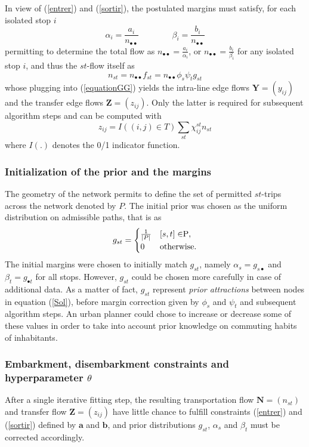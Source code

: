 \documentclass{bmcart}
\begin{document}
In view of (\ref{entrer}) and (\ref{sortir}), the postulated margins must satisfy, for each isolated stop $i$
\begin{equation}
\label{ }
\alpha_i=\frac{a_i}{n_{\bullet \bullet}}\qquad\qquad \beta_i=\frac{b_i}{n_{\bullet \bullet}}
\end{equation}
permitting to determine the total flow as $n_{\bullet \bullet}=\frac{a_i}{\alpha_i}$, or  $n_{\bullet \bullet}=\frac{b_i}{\beta_i}$ for any isolated stop $i$, and thus 
the $st$-flow itself as 
\begin{equation}
	\label{flow_from_distrib}
	n_{st} = n_{\bullet \bullet} f_{st}= n_{\bullet \bullet}\phi_s \psi_t g_{st} 
\end{equation}
whose plugging into (\ref{equationGG}) yields the intra-line edge flows $\mathbf{Y}=(y_{ij})$ and the transfer edge flows $\mathbf{Z}=(z_{ij})$. Only the latter is required for subsequent algorithm steps and can be computed with 
\begin{equation}
	z_{ij} = I((i,j) \in T)\sum_{st} \chi_{ij}^{st} n_{st}
\end{equation}
where $I(.)$ denotes the 0/1 indicator function.
\subsubsection{Initialization of the prior and the margins}
The geometry of the network permits to define the set of permitted $st$-trips across the network denoted by $P$. The initial prior was chosen as the uniform distribution on admissible paths, that is as
\begin{equation*}
g_{st} = \begin{cases}
  \frac{1}{\vert P \vert}    & [s, t] \in $P$, \\
  0    & \text{otherwise}.
\end{cases}
\end{equation*}
The initial margins were chosen to initially match $g_{st}$, namely $\alpha_s=g_{s \bullet}$ and $\beta_t=g_{\bullet t}$ for all stops. However, $g_{st}$ could be chosen more carefully in case of additional data. As a matter of fact, $g_{st}$ represent \emph{prior attractions} between nodes in equation (\ref{Sol}), before margin correction given by $\phi_s$ and $\psi_t$ and subsequent algorithm steps. An urban planner could chose to increase or decrease some of these values in order to take into account prior knowledge on commuting habits of inhabitants.

\subsubsection{Embarkment, disembarkment constraints and hyperparameter $\theta$}
\label{constraints}
After a single iterative fitting step, the resulting transportation flow $\mathbf{N}=(n_{st})$ and transfer flow $\mathbf{Z}=(z_{ij})$ have little chance to fulfill constraints (\ref{entrer}) and (\ref{sortir}) defined by $\mathbf{a}$ and $\mathbf{b}$, and prior distributions $g_{st}$, $\alpha_s$ and $\beta_t$ must be corrected accordingly.
\end{document}
